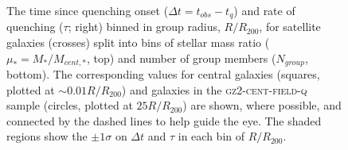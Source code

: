 \begin{figure}
{\caption[Trend of $\Delta t$ and $\tau$ with group radius split by number in group and stellar mass ratio]{The time since quenching onset ($\Delta t = t_{obs} - t_{q}$) and rate of quenching ($\tau$; right) binned in group radius, $R/R_{200}$, for satellite galaxies (crosses) split into bins of stellar mass ratio ($\mu_* = M_*/M_{cent,*}$, top) and number of group members ($N_{group}$, bottom). The corresponding values for central galaxies (squares, plotted at $\sim0.01 R/R_{200}$) and galaxies in the \textsc{gz2-cent-field-q} sample (circles, plotted at $25 R/R_{200}$) are shown, where possible, and connected by the dashed lines to help guide the eye. The shaded regions show the $\pm1\sigma$ on $\Delta t$ and $\tau$ in each bin of $R/R_{200}$.}
\label{fig:timesinceradiusmu}}
\end{figure}

